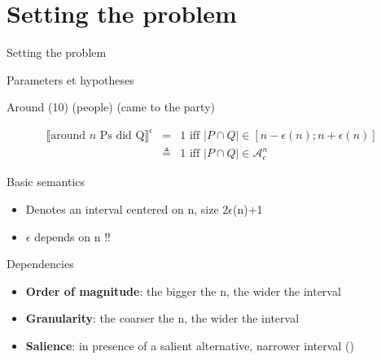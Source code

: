 \documentclass[xcolor=table, hyperref={pdfpagelabels=false}]{beamer}
\begin{document}
\section{Setting the problem} 
\begin{frame}{}
\begin{center}
	\Huge Setting the problem
\end{center}
\end{frame}
\begin{frame}{Parameters et hypotheses}\vspace{-3mm}
\begin{center}
	Around (10) (people) (came to the party)
\end{center}\vspace{-4mm}
\begin{eqnarray*}
	\llbracket \mbox{around } n \mbox{ Ps did Q}\rrbracket^{\epsilon} &=& 1 \mbox{ iff } |P \cap Q| \in [n-\epsilon(n); n+\epsilon(n)]\\
	&\triangleq& 1 \mbox{ iff } |P \cap Q| \in \mathcal{A}^n_{\epsilon}
\end{eqnarray*}\vspace{-8mm}
\begin{block}{Basic semantics}
	\begin{itemize}
		\item Denotes an interval centered on n, size 2$\epsilon$(n)+1
		\item $\epsilon$ depends on n !!
	\end{itemize}
\end{block}\pause
\begin{exampleblock}{Dependencies}
	\begin{itemize}
		\item \textbf{Order of magnitude}: the bigger the n, the wider  the interval\pause
		\item \textbf{Granularity}: the coarser the n, the wider the interval\pause
		\item \textbf{Salience}: in presence of a salient alternative, narrower interval (\cite{cummins2012})
	\end{itemize}
\end{exampleblock}
\end{frame}
\end{document}
